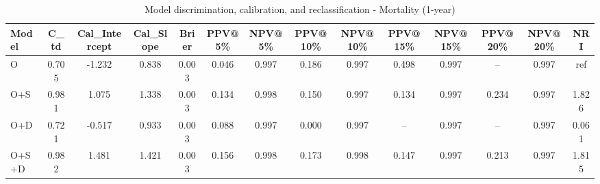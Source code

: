 \begin{table}[htbp]
\centering
\small
\caption{Model discrimination, calibration, and reclassification - Mortality (1-year)}
\label{tab:perf_mortality_1y}
\begin{tabular}{lccccccccccccc}
\toprule
Model & C\_td & Cal\_Intercept & Cal\_Slope & Brier & PPV@5\% & NPV@5\% & PPV@10\% & NPV@10\% & PPV@15\% & NPV@15\% & PPV@20\% & NPV@20\% & NRI \\
\midrule
O & 0.705 & -1.232 & 0.838 & 0.003 & 0.046 & 0.997 & 0.186 & 0.997 & 0.498 & 0.997 & -- & 0.997 & ref \\
O+S & 0.981 & 1.075 & 1.338 & 0.003 & 0.134 & 0.998 & 0.150 & 0.997 & 0.134 & 0.997 & 0.234 & 0.997 & 1.826 \\
O+D & 0.721 & -0.517 & 0.933 & 0.003 & 0.088 & 0.997 & 0.000 & 0.997 & -- & 0.997 & -- & 0.997 & 0.061 \\
O+S+D & 0.982 & 1.481 & 1.421 & 0.003 & 0.156 & 0.998 & 0.173 & 0.998 & 0.147 & 0.997 & 0.213 & 0.997 & 1.815 \\
\bottomrule
\end{tabular}
\end{table}